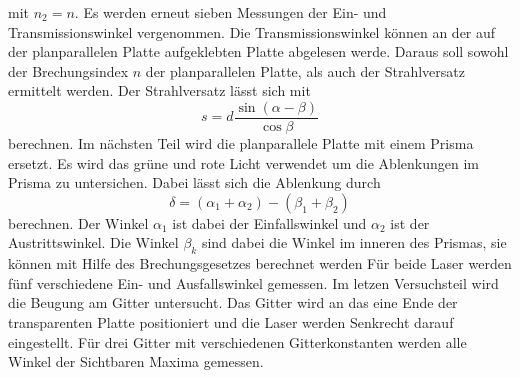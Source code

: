 mit $n_2=n$. Es werden erneut sieben Messungen der Ein- und Transmissionswinkel vergenommen. Die Transmissionswinkel können an der auf der planparallelen Platte aufgeklebten Platte abgelesen werde.
Daraus soll sowohl der Brechungsindex $n$ der planparallelen Platte, als auch der Strahlversatz ermittelt werden.
Der Strahlversatz lässt sich mit
\begin{equation}
    s=d \frac{\sin\left(\alpha- \beta\right)}{\cos \beta}
    \label{eqn:strahlversatz}
\end{equation}
berechnen. 
Im nächsten Teil wird die planparallele Platte mit einem Prisma ersetzt. Es wird das grüne und rote Licht verwendet um die Ablenkungen im Prisma zu untersichen. Dabei lässt sich
die Ablenkung durch
\begin{equation}
    \delta= (\alpha_1 + \alpha_2)- (\beta_1+ \beta_2)
    \label{eqn:ablenk}
\end{equation}
berechnen. Der Winkel $\alpha_1$ ist dabei der Einfallswinkel und $\alpha_2$ ist der Austrittswinkel. Die Winkel $\beta_k$ sind dabei die Winkel im inneren des Prismas, sie können mit Hilfe des Brechungsgesetzes berechnet werden
Für beide Laser werden fünf verschiedene Ein- und Ausfallswinkel gemessen. 
Im letzen Versuchsteil wird die Beugung am Gitter untersucht. Das Gitter wird an das eine Ende der transparenten Platte positioniert und die Laser werden Senkrecht darauf eingestellt.
Für drei Gitter mit verschiedenen Gitterkonstanten werden alle Winkel der Sichtbaren Maxima gemessen. 
